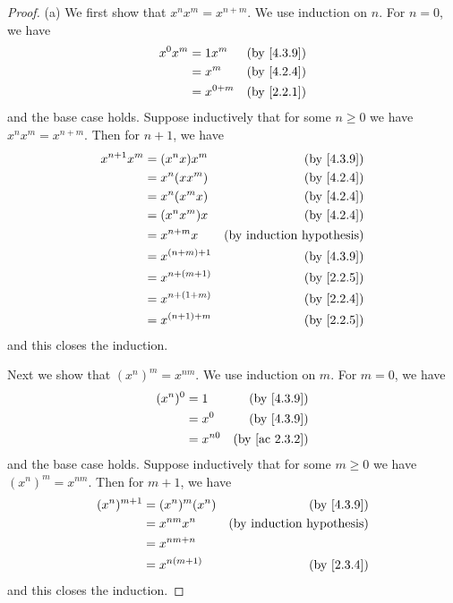 \begin{proof}{(a)}
  We first show that \(x^n x^m = x^{n + m}\).
  We use induction on \(n\).
  For \(n = 0\), we have
  \begin{align*}
    x^0 x^m & = 1 x^m     & \text{(by \cref{4.3.9})} \\
            & = x^m       & \text{(by \cref{4.2.4})} \\
            & = x^{0 + m} & \text{(by \cref{2.2.1})}
  \end{align*}
  and the base case holds.
  Suppose inductively that for some \(n \geq 0\) we have \(x^n x^m = x^{n + m}\).
  Then for \(n + 1\), we have
  \begin{align*}
    x^{n + 1} x^m & = (x^n x) x^m     & \text{(by \cref{4.3.9})}         \\
                  & = x^n (x x^m)     & \text{(by \cref{4.2.4})}         \\
                  & = x^n (x^m x)     & \text{(by \cref{4.2.4})}         \\
                  & = (x^n x^m) x     & \text{(by \cref{4.2.4})}         \\
                  & = x^{n + m} x     & \text{(by induction hypothesis)} \\
                  & = x^{(n + m) + 1} & \text{(by \cref{4.3.9})}         \\
                  & = x^{n + (m + 1)} & \text{(by \cref{2.2.5})}         \\
                  & = x^{n + (1 + m)} & \text{(by \cref{2.2.4})}         \\
                  & = x^{(n + 1) + m} & \text{(by \cref{2.2.5})}
  \end{align*}
  and this closes the induction.

  Next we show that \((x^n)^m = x^{nm}\).
  We use induction on \(m\).
  For \(m = 0\), we have
  \begin{align*}
    (x^n)^0 & = 1      & \text{(by \cref{4.3.9})}    \\
            & = x^0    & \text{(by \cref{4.3.9})}    \\
            & = x^{n0} & \text{(by \cref{ac 2.3.2})}
  \end{align*}
  and the base case holds.
  Suppose inductively that for some \(m \geq 0\) we have \((x^n)^m = x^{nm}\).
  Then for \(m + 1\), we have
  \begin{align*}
    (x^n)^{m + 1} & = (x^n)^m (x^n) & \text{(by \cref{4.3.9})}         \\
                  & = x^{nm} x^n    & \text{(by induction hypothesis)} \\
                  & = x^{nm + n}                                       \\
                  & = x^{n(m + 1)}  & \text{(by \cref{2.3.4})}
  \end{align*}
  and this closes the induction.


\end{proof}
